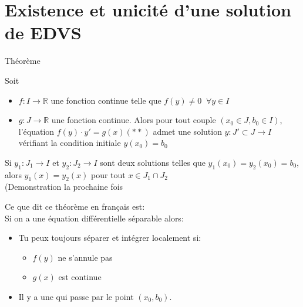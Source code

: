 \section{Existence et unicité d'une solution de EDVS}
\begin{parag}{Théorème}
    \begin{theoreme}
        Soit \begin{itemize}
            \item $f: I \to \mathbb{R}$ une fonction continue telle que $f(y) \neq 0\;\; \forall y \in I$
            \item $g : J \to \mathbb{R}$ une fonction continue. Alors pour tout couple $(x_0 \in J, b_0 \in I)$, l'équation $f(y)\cdot y' = g(x) (**)$ admet une solution $y : J' \subset J \to I$ vérifiant la condition initiale $y(x_0) = b_0$
        \end{itemize}
        Si $y_1 : J_1 \to I$ et $y_2 : J_2 \to I$ sont deux solutions telles que $y_1(x_0) = y_2(x_0) = b_0$, alors $y_1(x) = y_2(x)$ pour tout $x \in J_1 \cap J_2$
        \\
        (Demonstration la prochaine fois
        
    \end{theoreme}
    \begin{framedremark}
        Ce que dit ce théorème en français est:\\
        Si on a une équation différentielle séparable alors:\\
        \begin{itemize}
            \item Tu peux toujours séparer et intégrer localement si:
                \begin{itemize}
                    \item $f\left(y\right)$  ne s'annule pas
                    \item $g\left(x\right)$ est continue
                \end{itemize}
            \item Il y a une  qui passe par le point $\left(x_0, b_0\right)$.
        \end{itemize}
        
    \end{framedremark}
\end{parag}
